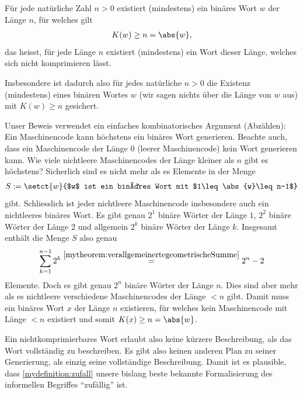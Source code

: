 \begin{mytheorem}\label{mytheorem:nichtkomprimierbar}
	Für jede natürliche Zahl $n>0$ existiert (mindestens) ein binäres Wort $w$ der Länge $n$, für welches gilt
	\begin{align*}
		K(w)\geq n = \abs{w},
	\end{align*}
	das heisst, für jede Länge $n$ existiert (mindestens) ein Wort dieser Länge, welches sich nicht komprimieren lässt.

	\vspace{\baselineskip}
	Insbesondere ist dadurch also für jedes natürliche $n>0$ die Existenz (mindestens) eines binären Wortes $w$ (wir sagen nichts über die Länge von $w$ aus) mit $K(w)\geq n$ gesichert.
	\begin{myproof}
		Unser Beweis verwendet ein einfaches kombinatorisches Argument (Abzählen): Ein Maschinencode kann höchstens ein binäres Wort generieren. Beachte auch, dass ein Maschinencode der Länge $0$ (leerer Maschinencode) kein Wort generieren kann. Wie viele nichtleere Maschinencodes der Länge kleiner als $n$ gibt es höchstens? Sicherlich sind es nicht mehr als es Elemente in der Menge
		\begin{align*}
			S := \setct{w}{$w$ ist ein binäres Wort mit $1\leq\abs{w}\leq n-1$}
		\end{align*}
		gibt. Schliesslich ist jeder nichtleere Maschinencode insbesondere auch ein nichtleeres binäres Wort. Es gibt genau $2^1$ binäre Wörter der Länge $1$, $2^2$ binäre Wörter der Länge $2$ und allgemein $2^k$ binäre Wörter der Länge $k$. Insgesamt enthält die Menge $S$ also genau
		\begin{align*}
			\sum_{k = 1}^{n-1} 2^k \stackrel{\cref{mytheorem:verallgemeinertegeometrischeSumme}}{=} 2^n - 2
		\end{align*}
		Elemente. Doch es gibt genau $2^n$ binäre Wörter der Länge $n$. Dies sind aber mehr als es nichtleere verschiedene Maschinencodes der Länge $<n$ gibt. Damit muss ein binäres Wort $x$ der Länge $n$ existieren, für welches kein Maschinencode mit Länge $<n$ existiert und somit $K(x) \geq n = \abs{w}$.
	\end{myproof}
\end{mytheorem}

Ein nichtkomprimierbares Wort erlaubt also keine kürzere Beschreibung, als das Wort vollständig zu beschreiben. Es gibt also keinen anderen Plan zu seiner Generierung, als einzig seine vollständige Beschreibung. Damit ist es plausible, dass \cref{mydefinition:zufall} unsere bislang beste bekannte Formalisierung des informellen Begriffes \enquote{zufällig} ist.

